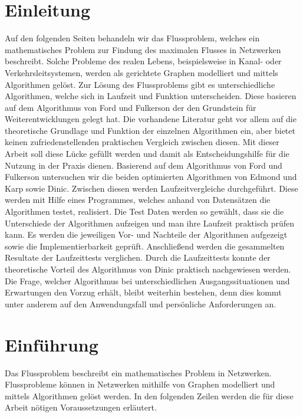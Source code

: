 \documentclass[a4paper]{llncs}
\begin{document}
\section{Einleitung}
\label{Einleitung}

Auf den folgenden Seiten behandeln wir das Flussproblem, welches ein mathematisches Problem zur Findung des maximalen Flusses in Netzwerken beschreibt.
 Solche Probleme des realen Lebens, beispielsweise in Kanal- oder Verkehrsleitsystemen, werden als gerichtete Graphen modelliert und mittels Algorithmen gelöst.
 Zur Lösung des Flussproblems gibt es unterschiedliche Algorithmen, welche sich in Laufzeit und Funktion unterscheiden. Diese basieren auf dem Algorithmus von Ford und Fulkerson der den Grundstein für Weiterentwicklungen gelegt hat.
 Die vorhandene Literatur geht vor allem auf die theoretische Grundlage und Funktion der einzelnen Algorithmen ein,  aber bietet keinen zufriedenstellenden praktischen Vergleich zwischen diesen.
 Mit dieser Arbeit soll diese Lücke gefüllt werden und damit als Entscheidungshilfe für die Nutzung in der Praxis dienen.
Basierend auf dem Algorithmus von Ford und Fulkerson untersuchen wir die beiden optimierten Algorithmen von Edmond und Karp sowie Dinic.
Zwischen diesen werden Laufzeitvergleiche durchgeführt.
Diese werden mit Hilfe eines Programmes, welches anhand von Datensätzen die Algorithmen testet, realisiert.
Die Test Daten werden so gewählt, dass sie die Unterschiede der Algorithmen aufzeigen und man ihre Laufzeit praktisch prüfen kann.
Es werden die jeweiligen Vor- und Nachteile der Algorithmen aufgezeigt sowie die Implementierbarkeit geprüft. Anschließend werden die gesammelten Resultate der Laufzeittests verglichen.
Durch die Laufzeittests konnte der theoretische Vorteil des Algorithmus von Dinic praktisch nachgewiesen werden.
 Die Frage, welcher Algorithmus bei unterschiedlichen Ausgangssituationen und Erwartungen den Vorzug erhält, bleibt weiterhin bestehen, denn dies kommt unter anderem auf den Anwendungsfall und persönliche Anforderungen an.

\section{Einführung}
\label{Einfuehrung}

Das Flussproblem beschreibt ein mathematisches Problem in Netzwerken.\\
Flussprobleme können in Netzwerken mithilfe von Graphen modelliert und mittels Algorithmen gelöst werden. In den folgenden Zeilen werden die für diese Arbeit nötigen Voraussetzungen erläutert.
\end{document}
